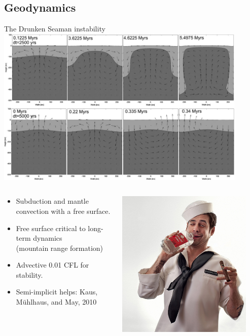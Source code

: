 \documentclass{beamer}
\begin{document}
\subsection{Geodynamics}
\begin{frame}[shrink=5]{The Drunken Seaman instability}
  \includegraphics[width=0.9\textwidth]{figures/DrunkenSeaman} \\
  \begin{columns}
    \begin{column}{0.8\textwidth}
      \begin{itemize}
      \item Subduction and mantle convection with a free surface.
      \item Free surface critical to long-term dynamics \\
        (\eg mountain range formation)
      \item Advective 0.01 CFL for stability.
      \item Semi-implicit helps: Kaus, M\"uhlhaus, and May, 2010
      \end{itemize}
    \end{column}
    \begin{column}{0.2\textwidth}
      \includegraphics[width=0.9\textwidth]{figures/DrunkenSeamanBottle}

\end{column}
\end{columns}
\end{frame}
\end{document}
